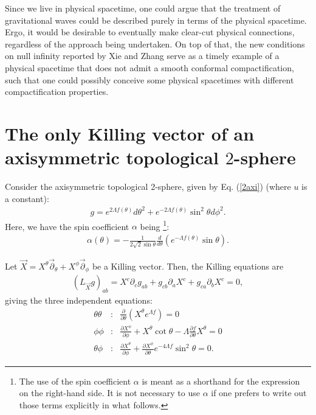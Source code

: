 \documentclass[aps,pre,preprint,superscriptaddress,showpacs,showkeys]{revtex4-1}
\begin{document}
Since we live in physical spacetime, one could argue that the treatment of gravitational waves could be described purely in terms of the physical spacetime. Ergo, it would be desirable to eventually make clear-cut physical connections, regardless of the approach being undertaken. On top of that, the new conditions on null infinity reported by Xie and Zhang \cite{Zhang} serve as a timely example of a physical spacetime that does not admit a smooth conformal compactification, such that one could possibly conceive some physical spacetimes with different compactification properties.

\appendix

\section{The only Killing vector of an axisymmetric topological $2$-sphere}\label{appendix}

Consider the axisymmetric topological 2-sphere, given by Eq. (\ref{2axi}) (where $u$ is a constant):
\begin{eqnarray}
g=e^{2\Lambda f(\theta)}d\theta^2+e^{-2\Lambda f(\theta)}\sin^2{\theta}d\phi^2.
\end{eqnarray}
Here, we have the spin coefficient $\alpha$ being \cite{Vee2016} \footnote{The use of the spin coefficient $\alpha$ is meant as a shorthand for the expression on the right-hand side. It is not necessary to use $\alpha$ if one prefers to write out those terms explicitly in what follows.}:
\begin{eqnarray}\label{alphaauxi}
\alpha(\theta)=-\frac{1}{2\sqrt{2}\sin{\theta}}\frac{d}{d\theta}\left(e^{-\Lambda f(\theta)}\sin{\theta}\right).
\end{eqnarray}

Let $\vec{X}=X^\theta\vec{\partial}_\theta+X^\phi\vec{\partial}_\phi$ be a Killing vector. Then, the Killing equations are
\begin{eqnarray}
(L_{\vec{X}}g)_{ab}=X^c\partial_cg_{ab}+g_{cb}\partial_aX^c+g_{ca}\partial_bX^c=0,
\end{eqnarray}
giving the three independent equations:
\begin{eqnarray}
\theta\theta&:&\frac{\partial}{\partial\theta}\left(X^\theta e^{\Lambda f}\right)=0\label{Killing1}\\
\phi\phi&:&\frac{\partial X^\phi}{\partial\phi}+X^\theta\cot{\theta}-\Lambda\frac{\partial f}{\partial\theta}X^\theta=0\label{Killing2}\\
\theta\phi&:&\frac{\partial X^\theta}{\partial\phi}+\frac{\partial X^\phi}{\partial\theta}e^{-4\Lambda f}\sin^2{\theta}=0.\label{Killing3}
\end{eqnarray}
\end{document}
